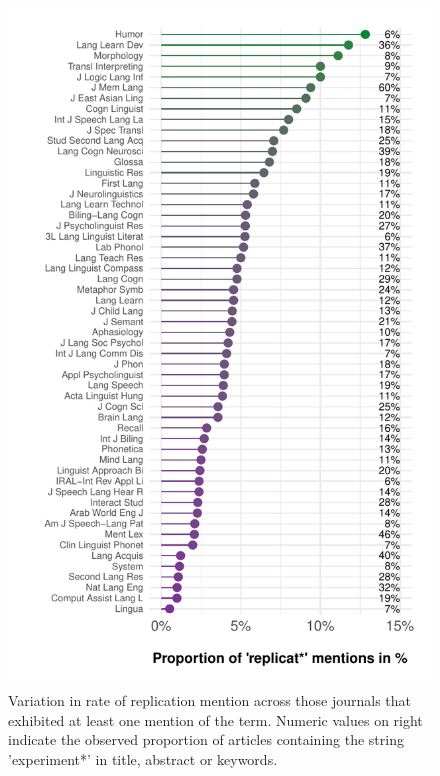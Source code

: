 \documentclass[]{elsarticle} %
\begin{document}
\begin{figure}

{\centering \includegraphics[width=1\linewidth]{ReplicationLing_files/figure-latex/topten-plot-1} 

}

\caption{Variation in rate of replication mention across those journals that exhibited at least one mention of the term. Numeric values on right indicate the observed proportion of articles containing the string 'experiment*' in title, abstract or keywords.}\label{fig:topten-plot}
\end{figure}
\end{document}
